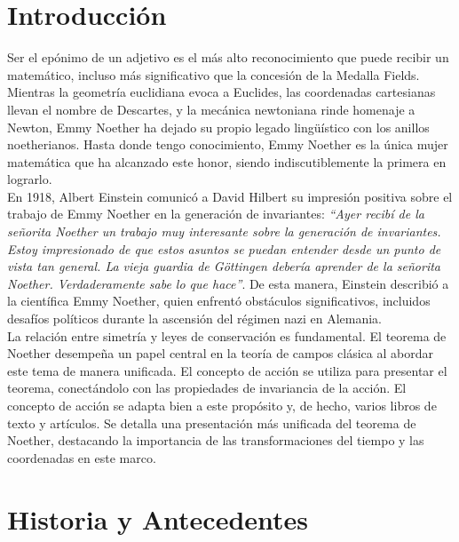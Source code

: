 \documentclass[a4paper,11pt]{article}
\begin{document}
\section{Introducción}
Ser el epónimo de un adjetivo es el más alto reconocimiento que puede recibir un matemático, incluso más significativo que la concesión de la Medalla Fields. Mientras la geometría euclidiana evoca a Euclides, las coordenadas cartesianas llevan el nombre de Descartes, y la mecánica newtoniana rinde homenaje a Newton, Emmy Noether ha dejado su propio legado lingüístico con los anillos noetherianos. Hasta donde tengo conocimiento, Emmy Noether es la única mujer matemática que ha alcanzado este honor, siendo indiscutiblemente la primera en lograrlo.\cite{Volker}
\\
En 1918, Albert Einstein comunicó a David Hilbert su impresión positiva sobre el trabajo de Emmy Noether en la generación de invariantes: \textit{“Ayer recibí de la señorita Noether un trabajo muy interesante sobre la generación de invariantes. Estoy impresionado de que estos asuntos se puedan entender desde un punto de vista tan general. La vieja guardia de Göttingen debería aprender de la señorita Noether. Verdaderamente sabe lo que hace”}\cite{Valenzuela}. De esta manera, Einstein describió a la científica Emmy Noether, quien enfrentó obstáculos significativos, incluidos desafíos políticos durante la ascensión del régimen nazi en Alemania.
\\

La relación entre simetría y leyes de conservación es fundamental. El teorema de Noether desempeña un papel central en la teoría de campos clásica al abordar este tema de manera unificada. El concepto de acción se utiliza para presentar el teorema, conectándolo con las propiedades de invariancia de la acción. El concepto de acción se adapta bien a este propósito y, de hecho, varios libros de texto\cite{Goldstein} y artículos.\cite{Hill} 
Se detalla una presentación más unificada del teorema de Noether, destacando la importancia de las transformaciones del tiempo y las coordenadas en este marco.





\section{Historia y Antecedentes}
\end{document}
